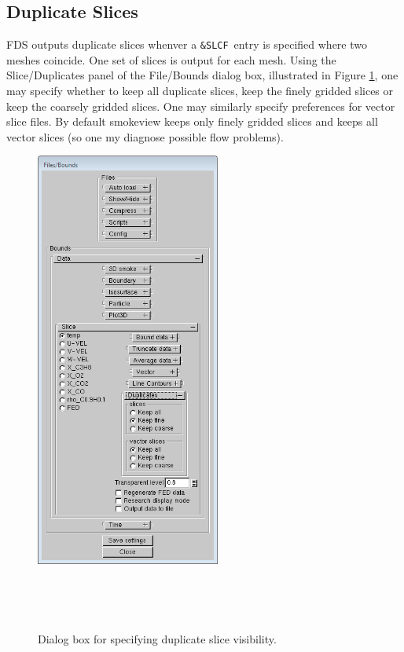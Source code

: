 \documentclass[11pt,twoside]{book}
\begin{document}
\subsection{Duplicate Slices}
FDS outputs duplicate slices whenver a {\tt \&SLCF}\ entry is specified where two meshes coincide.  One set of slices is output for each mesh.  Using the Slice/Duplicates panel of the File/Bounds dialog box, illustrated in Figure \ref{fig:sliceduplicate}, one may specify whether to keep all duplicate slices, keep the finely gridded slices or keep the coarsely gridded slices.  One may similarly specify preferences for vector slice files. By default smokeview keeps only finely gridded slices and keeps all vector slices (so one my diagnose possible flow problems).

\begin{figure}[bph]
\centerline{
\includegraphics[width=2.390305555in]{FIGURES/figsliceduplicate}
}\ \caption[Dialog box for specifying duplicate slice visibility.]{Dialog box for specifying duplicate slice visibility.}\ \label{fig:sliceduplicate}
\end{figure}
\end{document}
